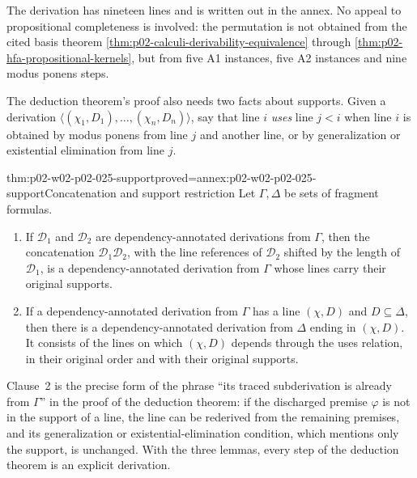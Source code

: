 The derivation has nineteen lines and is written out in the annex.  No
appeal to propositional completeness is involved: the permutation is not
obtained from the cited basis theorem
\cref{thm:p02-calculi-derivability-equivalence} through
\cref{thm:p02-hfa-propositional-kernels}, but from five A1 instances, five A2
instances and nine modus ponens steps.

The deduction theorem's proof also needs two facts about supports.  Given a
derivation \(\langle(\chi_1,D_1),\ldots,(\chi_n,D_n)\rangle\), say that line
\(i\) \emph{uses} line \(j<i\) when line \(i\) is obtained by modus ponens
from line \(j\) and another line, or by generalization or existential
elimination from line \(j\).

\begin{hblemma}{thm:p02-w02-p02-025-support}{proved=annex:p02-w02-p02-025-support}{Concatenation and support restriction}
Let \(\Gamma,\Delta\) be sets of fragment formulas.
\begin{enumerate}
  \item If \(\mathcal D_1\) and \(\mathcal D_2\) are dependency-annotated
        derivations from \(\Gamma\), then the concatenation
        \(\mathcal D_1\mathcal D_2\), with the line references of
        \(\mathcal D_2\) shifted by the length of \(\mathcal D_1\), is a
        dependency-annotated derivation from \(\Gamma\) whose lines carry
        their original supports.
  \item If a dependency-annotated derivation from \(\Gamma\) has a line
        \((\chi,D)\) and \(D\subseteq\Delta\), then there is a
        dependency-annotated derivation from \(\Delta\) ending in
        \((\chi,D)\).  It consists of the lines on which \((\chi,D)\)
        depends through the uses relation, in their original order and with
        their original supports.
\end{enumerate}
\end{hblemma}

Clause~2 is the precise form of the phrase ``its traced subderivation is
already from \(\Gamma\)'' in the proof of the deduction theorem: if the
discharged premise \(\varphi\) is not in the support of a line, the line can
be rederived from the remaining premises, and its generalization or
existential-elimination condition, which mentions only the support, is
unchanged.  With the three lemmas, every step of the deduction theorem is an
explicit derivation.

